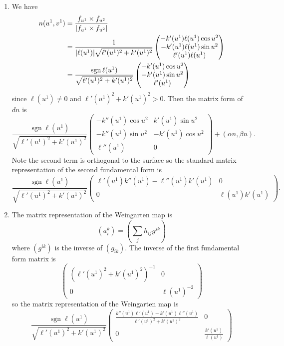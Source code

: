 \documentclass[a4paper, 12pt]{article}
\DeclarePairedDelimiter\abs{\lvert}{\rvert}
\DeclareMathOperator{\sgn}{sgn}
\begin{document}
\begin{enumerate}
\begin{enumerate}
\item We have
\begin{align*}
n(u^1,v^1)&=\frac{f_{u^1}\times f_{u^2}}{\abs{f_{u^1}\times f_{u^2}}}\\
&=\frac{1}{\abs{\ell(u^1)}\sqrt{\ell'(u^1)^2+k'(u^1)^2}}\begin{pmatrix}
-k'(u^1)\ell(u^1)\cos u^2\\
-k'(u^1)\ell(u^1)\sin u^2\\
\ell'(u^1)\ell(u^1)
\end{pmatrix}\\
&=\frac{\sgn\ell(u^1)}{\sqrt{\ell'(u^1)^2+k'(u^1)^2}}\begin{pmatrix}
-k'(u^1)\cos u^2\\
-k'(u^1)\sin u^2\\
\ell'(u^1)
\end{pmatrix}
\end{align*}
since \(\ell(u^1)\neq0\) and \(\ell'(u^1)^2+k'(u^1)^2>0\). Then the matrix form of \(dn\) is
\[\frac{\sgn\ell(u^1)}{\sqrt{\ell'(u^1)^2+k'(u^1)^2}}\begin{pmatrix}
-k''(u^1)\cos u^2&k'(u^1)\sin u^2\\
-k''(u^1)\sin u^2&-k'(u^1)\cos u^2\\
\ell''(u^1)&0
\end{pmatrix}
+(\alpha n,\beta n).
\]
Note the second term is orthogonal to the surface so the standard matrix representation of the second fundamental form is
\[\frac{\sgn\ell(u^1)}{\sqrt{\ell'(u^1)^2+k'(u^1)^2}}\begin{pmatrix}
\ell'(u^1)k''(u^1)-\ell''(u^1)k'(u^1)&0\\
0&\ell(u^1)k'(u^1)
\end{pmatrix}.
\]

\item The matrix representation of the Weingarten map is
\[(a^k_i)=\left(\sum_{j}h_{ij}g^{jk}\right)\]
where \((g^{ik})\) is the inverse of \((g_{ik})\). The inverse of the first fundamental form matrix is
\[\begin{pmatrix}
(\ell'(u^1)^2+k'(u^1)^2)^{-1}&0\\
0&\ell(u^1)^{-2}
\end{pmatrix}\]
so the matrix representation of the Weingarten map is
\[\frac{\sgn\ell(u^1)}{\sqrt{\ell'(u^1)^2+k'(u^1)^2}}\begin{pmatrix}
\frac{k''(u^1)\ell'(u^1)-k'(u^1)\ell''(u^1)}{\ell'(u^1)^2+k'(u^1)^2}&0\\
0&\frac{k'(u^1)}{\ell(u^1)}
\end{pmatrix}\]


\end{enumerate}
\end{enumerate}
\end{document}

